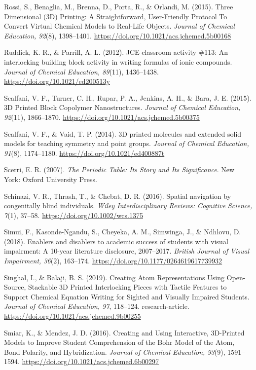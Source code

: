 \documentclass[11.5pt]{sig-alternate} %
\begin{document}
Rossi, S., Benaglia, M., Brenna, D., Porta, R., \& Orlandi, M. (2015). Three Dimensional (3D) Printing: A Straightforward, User-Friendly Protocol To Convert Virtual Chemical Models to Real-Life Objects. \textit{Journal of Chemical Education, 92}(8), 1398–1401. \url{https://doi.org/10.1021/acs.jchemed.5b00168}

Ruddick, K. R., \& Parrill, A. L. (2012). JCE classroom activity \#113: An interlocking building block activity in writing formulas of ionic compounds. \textit{Journal of Chemical Education, 89}(11), 1436–1438. \url{https://doi.org/10.1021/ed200513y}

Scalfani, V. F., Turner, C. H., Rupar, P. A., Jenkins, A. H., \& Bara, J. E. (2015). 3D Printed Block Copolymer Nanostructures. \textit{Journal of Chemical Education, 92}(11), 1866–1870. \url{https://doi.org/10.1021/acs.jchemed.5b00375}

Scalfani, V. F., \& Vaid, T. P. (2014). 3D printed molecules and extended solid models for teaching symmetry and point groups. \textit{Journal of Chemical Education, 91}(8), 1174–1180. \url{https://doi.org/10.1021/ed400887t}

Scerri, E. R. (2007). \textit{The Periodic Table: Its Story and Its Significance}. New York: Oxford University Press.

Schinazi, V. R., Thrash, T., \& Chebat, D. R. (2016). Spatial navigation by congenitally blind individuals. \textit{Wiley Interdisciplinary Reviews: Cognitive Science, 7}(1), 37–58. \url{https://doi.org/10.1002/wcs.1375}

Simui, F., Kasonde-Ngandu, S., Cheyeka, A. M., Simwinga, J., \& Ndhlovu, D. (2018). Enablers and disablers to academic success of students with visual impairment: A 10-year literature disclosure, 2007–2017. \textit{British Journal of Visual Impairment, 36}(2), 163–174. \url{https://doi.org/10.1177/0264619617739932}

Singhal, I., \& Balaji, B. S. (2019). Creating Atom Representations Using Open-Source, Stackable 3D Printed Interlocking Pieces with Tactile Features to Support Chemical Equation Writing for Sighted and Visually Impaired Students. \textit{Journal of Chemical Education, 97}, 118–124. research-article. \url{https://doi.org/10.1021/acs.jchemed.9b00255}

Smiar, K., \& Mendez, J. D. (2016). Creating and Using Interactive, 3D-Printed Models to Improve Student Comprehension of the Bohr Model of the Atom, Bond Polarity, and Hybridization. \textit{Journal of Chemical Education, 93}(9), 1591–1594. \url{https://doi.org/10.1021/acs.jchemed.6b00297}
\end{document}
